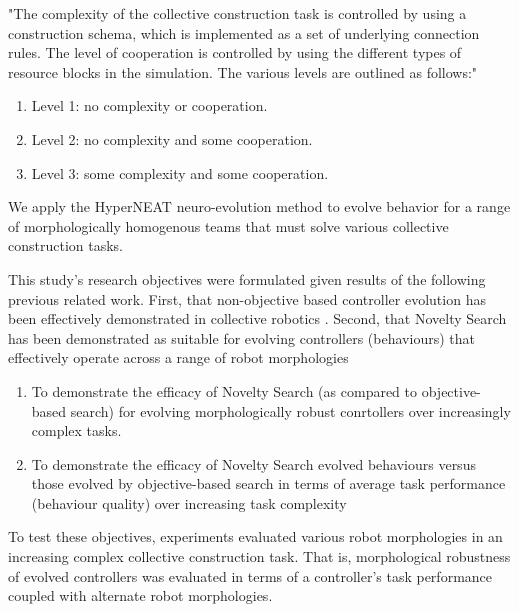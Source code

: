 "The complexity of the collective construction task is controlled by using a construction schema, which is implemented as a set of underlying connection rules. The level of cooperation is controlled by using the different types of resource blocks in the simulation.
The various levels are outlined as follows:"
\begin{enumerate}
	\item Level 1: no complexity or cooperation.
	\item Level 2: no complexity and some cooperation.
	\item Level 3: some complexity and some cooperation.
\end{enumerate}

We apply the HyperNEAT \cite{StanleyDAmbrosioGauci2009} neuro-evolution method to evolve
behavior for a range of morphologically homogenous teams that must solve various collective construction tasks.

This study's research objectives were formulated given results of the following previous related work. First, that non-objective based controller evolution has been effectively demonstrated in collective robotics \cite{RefWorks:11, gomes2013generic, RefWorks:5}.
Second, that Novelty Search has been demonstrated as suitable for evolving controllers (behaviours) that effectively operate across a range of robot morphologies






\begin{enumerate}
	\item To demonstrate the efficacy of Novelty Search (as compared to objective-based search) for evolving morphologically robust conrtollers over increasingly complex tasks.
	\item To demonstrate the efficacy of Novelty Search evolved behaviours versus those evolved by objective-based search in terms of average task performance (behaviour quality) over increasing task complexity
\end{enumerate}

To test these objectives, experiments evaluated various robot morphologies in an increasing complex collective construction task. 
That is, morphological robustness of evolved controllers was evaluated in terms of a controller's task performance coupled with alternate robot morphologies.

